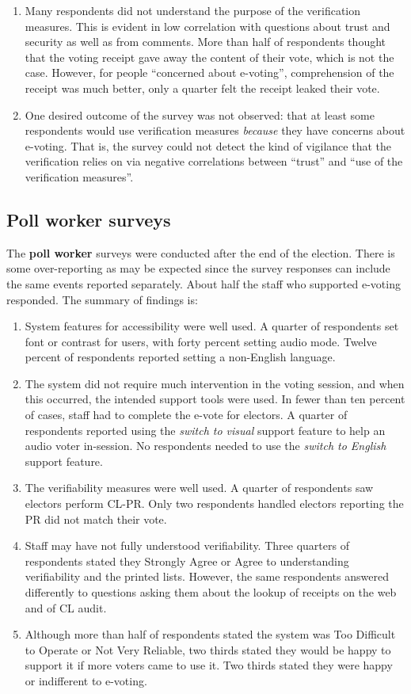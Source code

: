 \documentclass[twocolumn]{article}
\begin{document}
\begin{enumerate}
\item Many respondents did not understand the purpose of the verification measures.  This is evident in low correlation with questions about trust and security as well as from comments.  More than half of respondents thought that the voting receipt gave away the content of their vote, which is not the case.  However, for people ``concerned about e-voting'', comprehension of the receipt was much better, only a quarter felt the receipt leaked their vote.
\item One desired outcome of the survey was not observed: that at least some respondents would use verification measures {\em because} they have concerns about e-voting.  That is, the survey could not detect the kind of vigilance that the verification relies on via negative correlations between ``trust'' and ``use of the verification measures''.   
\end{enumerate}

\subsection*{Poll worker surveys}

The {\bf poll worker} surveys were conducted after the end of the election.  There is some over-reporting as may be expected since the survey responses can include the same events reported separately.  About half the staff who supported e-voting responded. The summary of findings is:
\begin{enumerate}
\item System features for accessibility were well used.  A quarter of respondents set font or contrast for users, with forty percent setting audio mode.  Twelve percent of respondents reported setting a non-English language.
\item The system did not require much intervention in the voting session, and when this occurred, the intended support tools were used.  In fewer than ten percent of cases, staff had to complete the e-vote for electors.  A quarter of respondents reported using the {\em switch to visual} support feature to help an audio voter in-session.  No respondents needed to use the {\em switch to English} support feature.
\item The verifiability measures were well used.  A quarter of respondents saw electors perform CL-PR.  Only two respondents handled electors reporting the PR did not match their vote.
\item Staff may have not fully understood verifiability.  Three quarters of respondents stated they Strongly Agree or Agree to understanding verifiability and the printed lists.  However, the same respondents answered differently to questions asking them about the lookup of receipts on the web and of CL audit.    
\item Although more than half of respondents stated the system was Too Difficult to Operate or Not Very Reliable, two thirds stated they would be happy to support it if more voters came to use it.  Two thirds stated they were happy or indifferent to e-voting.
\end{enumerate}
\end{document}
